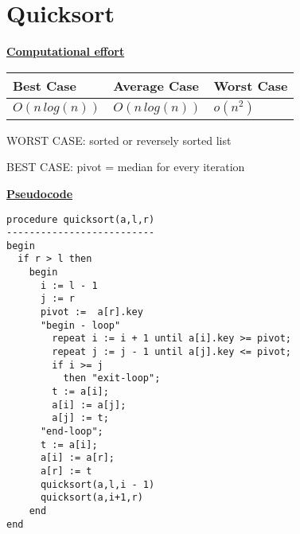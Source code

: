 \documentclass[a4paper]{report}
\begin{document}
\chapter*{Quicksort}

\underline{\bf{Computational effort}}


\begin{tabular}{|l|l|l|}
\hline
Best Case    & Average Case  &  Worst Case\\ \hline
$O(n\,log(n))$ & $O(n\,log(n))$  &  $o(n^2)$  \\ \hline
\end{tabular}


WORST CASE: sorted or reversely sorted list



BEST CASE: pivot = median for every iteration

\underline{\bf{Pseudocode}}

\begin{lstlisting}
procedure quicksort(a,l,r)
--------------------------
begin
  if r > l then    
    begin
      i := l - 1
      j := r
      pivot :=  a[r].key
      "begin - loop"
        repeat i := i + 1 until a[i].key >= pivot;
        repeat j := j - 1 until a[j].key <= pivot;
        if i >= j
          then "exit-loop";
        t := a[i];
        a[i] := a[j];
        a[j] := t;
      "end-loop";
      t := a[i];
      a[i] := a[r];
      a[r] := t
      quicksort(a,l,i - 1)
      quicksort(a,i+1,r)
    end
end 
\end{lstlisting}
\end{document}

